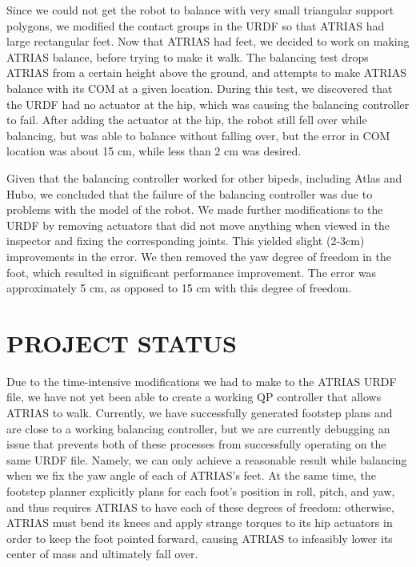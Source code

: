 \documentclass[letterpaper, 10 pt, conference]{ieeeconf}  %
\begin{document}
Since we could not get the robot to balance with very small triangular support polygons, we modified the contact groups in the URDF so that ATRIAS had large rectangular feet. Now that ATRIAS had feet, we decided to work on making ATRIAS balance, before trying to make it walk. The balancing test drops ATRIAS from a certain height above the ground, and attempts to make ATRIAS balance with its COM at a given location. During this test, we discovered that the URDF had no actuator at the hip, which was causing the balancing controller to fail. After adding the actuator at the hip, the robot still fell over while balancing, but was able to balance without falling over, but the error in COM location was about 15 cm, while less than 2 cm was desired. 

Given that the balancing controller worked for other bipeds, including Atlas and Hubo, we concluded that the failure of the balancing controller was due to problems with the model of the robot. We made further modifications to the URDF by removing actuators that did not move anything when viewed in the inspector and fixing the corresponding joints. This yielded slight (2-3cm) improvements in the error. We then removed the yaw degree of freedom in the foot, which resulted in significant performance improvement. The error was approximately 5 cm, as opposed to 15 cm with this degree of freedom.

\section{PROJECT STATUS}

Due to the time-intensive modifications we had to make to the ATRIAS URDF file, we have not yet been able to create a working QP controller that allows ATRIAS to walk. Currently, we have successfully generated footstep plans and are close to a working balancing controller, but we are currently debugging an issue that prevents both of these processes from successfully operating on the same URDF file. Namely, we can only achieve a reasonable result while balancing when we fix the yaw angle of each of ATRIAS’s feet. At the same time, the footstep planner explicitly plans for each foot’s position in roll, pitch, and yaw, and thus requires ATRIAS to have each of these degrees of freedom: otherwise, ATRIAS must bend its knees and apply strange torques to its hip actuators in order to keep the foot pointed forward, causing ATRIAS to infeasibly lower its center of mass and ultimately fall over.
\end{document}
